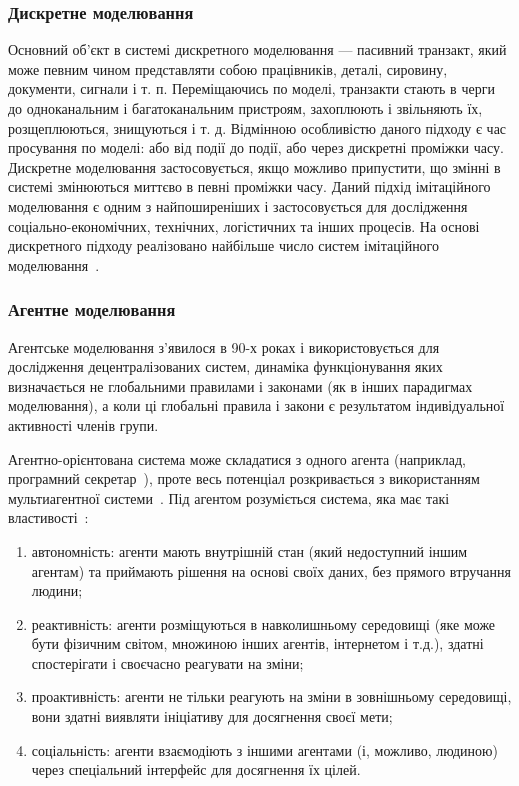\subsubsection{Дискретне моделювання}
Основний об'єкт в системі дискретного моделювання --- пасивний транзакт, який може певним чином представляти собою працівників, деталі, сировину, документи, сигнали і т. п.
Переміщаючись по моделі, транзакти стають в черги до одноканальним і багатоканальним пристроям, захоплюють і звільняють їх, розщеплюються, знищуються і т. д.
Відмінною особливістю даного підходу є час просування по моделі: або від події до події, або через дискретні проміжки часу. 
Дискретне моделювання застосовується, якщо можливо припустити, що змінні в системі змінюються миттєво в певні проміжки часу. 
Даний підхід імітаційного моделювання є одним з найпоширеніших і застосовується для дослідження соціально-економічних, технічних, логістичних та інших процесів.
На основі дискретного підходу реалізовано найбільше
число систем імітаційного моделювання~\cite{Shamrin2016}. 

\subsubsection{Агентне моделювання}
Агентське моделювання з'явилося в 90-х роках і використовується для дослідження децентралізованих систем, динаміка функціонування яких визначається не глобальними правилами і законами (як в інших парадигмах моделювання), а коли ці глобальні правила і закони є результатом індивідуальної активності членів групи.

Агентно-орієнтована система може складатися з одного агента (наприклад, програмний секретар~\cite{Maes1995}), проте весь потенціал розкривається з використанням мультиагентної системи~\cite{Waters1989}.
Під агентом розуміється система, яка має такі властивості~\cite{Jennings1998,Wooldridge1995}:
\begin{enumerate}[label={\arabic*)}]
	\item автономність: агенти мають внутрішній стан (який недоступний іншим агентам) та приймають рішення на основі своїх даних, без прямого втручання людини;
	\item реактивність: агенти розміщуються в навколишньому середовищі (яке може бути фізичним світом, множиною інших агентів, інтернетом і т.д.), здатні спостерігати і своєчасно реагувати на зміни;
	\item проактивність: агенти не тільки реагують на зміни в зовнішньому середовищі, вони здатні виявляти ініціативу для досягнення своєї мети;
	\item соціальність: агенти взаємодіють з іншими агентами (і, можливо, людиною) через спеціальний інтерфейс для досягнення їх цілей.
\end{enumerate}


